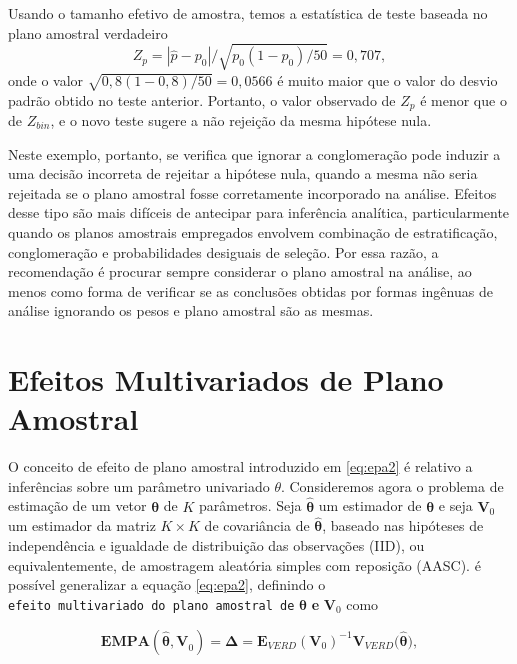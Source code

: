 \documentclass[]{book}
\theoremstyle{definition}
\theoremstyle{definition}
\theoremstyle{definition}
\theoremstyle{remark}
\begin{document}
Usando o tamanho efetivo de amostra, temos a estatística de teste
baseada no plano amostral verdadeiro \[
Z_{p}=|\widehat{p}-p_{0}|/\sqrt{p_{0}\left( 1-p_{0}\right) /50}=0,707 ,
\] onde o valor \(\sqrt{0,8\left( 1-0,8\right) /50}=0,0566\) é muito
maior que o valor do desvio padrão obtido no teste anterior. Portanto, o
valor observado de \(Z_{p}\) é menor que o de \(Z_{bin}\), e o novo
teste sugere a não rejeição da mesma hipótese nula.

Neste exemplo, portanto, se verifica que ignorar a conglomeração pode
induzir a uma decisão incorreta de rejeitar a hipótese nula, quando a
mesma não seria rejeitada se o plano amostral fosse corretamente
incorporado na análise. Efeitos desse tipo são mais difíceis de
antecipar para inferência analítica, particularmente quando os planos
amostrais empregados envolvem combinação de estratificação,
conglomeração e probabilidades desiguais de seleção. Por essa razão, a
recomendação é procurar sempre considerar o plano amostral na análise,
ao menos como forma de verificar se as conclusões obtidas por formas
ingênuas de análise ignorando os pesos e plano amostral são as mesmas.

\section{Efeitos Multivariados de Plano
Amostral}\label{efeitos-multivariados-de-plano-amostral}

O conceito de efeito de plano amostral introduzido em \eqref{eq:epa2} é
relativo a inferências sobre um parâmetro univariado \(\theta\).
Consideremos agora o problema de estimação de um vetor
\(\mathbf{\theta}\) de \(K\) parâmetros. Seja \(\mathbf{\hat{\theta}}\)
um estimador de \(\mathbf{\theta}\) e seja \(\mathbf{V}_{0}\) um
estimador da matriz \(K\times K\) de covariância de
\(\mathbf{\hat{\theta}}\), baseado nas hipóteses de independência e
igualdade de distribuição das observações (IID), ou equivalentemente, de
amostragem aleatória simples com reposição (AASC). é possível
generalizar a equação \eqref{eq:epa2}, definindo o
\texttt{efeito\ multivariado\ do\ plano\ amostral\ de}
\(\mathbf{\hat{\theta}}\) \textbf{e} \(\mathbf{V}_{0}\) como

\begin{equation}
\mathbf{EMPA}(\mathbf{\hat{\theta},V}_{0})=\mathbf{\Delta =E}_{VERD}\left( 
\mathbf{V}_{0}\right) ^{-1}\mathbf{V}_{VERD}(\mathbf{\hat{\theta}),}
\label{eq:epa6}
\end{equation}
\end{document}
